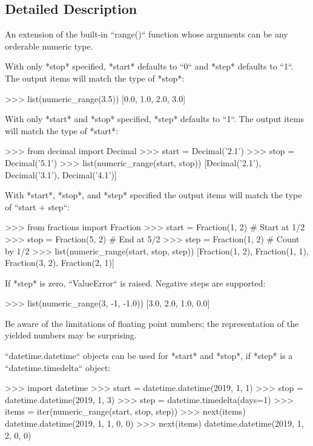 \subsection{Detailed Description}
\begin{DoxyVerb}An extension of the built-in ``range()`` function whose arguments can
be any orderable numeric type.

With only *stop* specified, *start* defaults to ``0`` and *step*
defaults to ``1``. The output items will match the type of *stop*:

    >>> list(numeric_range(3.5))
    [0.0, 1.0, 2.0, 3.0]

With only *start* and *stop* specified, *step* defaults to ``1``. The
output items will match the type of *start*:

    >>> from decimal import Decimal
    >>> start = Decimal('2.1')
    >>> stop = Decimal('5.1')
    >>> list(numeric_range(start, stop))
    [Decimal('2.1'), Decimal('3.1'), Decimal('4.1')]

With *start*, *stop*, and *step*  specified the output items will match
the type of ``start + step``:

    >>> from fractions import Fraction
    >>> start = Fraction(1, 2)  # Start at 1/2
    >>> stop = Fraction(5, 2)  # End at 5/2
    >>> step = Fraction(1, 2)  # Count by 1/2
    >>> list(numeric_range(start, stop, step))
    [Fraction(1, 2), Fraction(1, 1), Fraction(3, 2), Fraction(2, 1)]

If *step* is zero, ``ValueError`` is raised. Negative steps are supported:

    >>> list(numeric_range(3, -1, -1.0))
    [3.0, 2.0, 1.0, 0.0]

Be aware of the limitations of floating point numbers; the representation
of the yielded numbers may be surprising.

``datetime.datetime`` objects can be used for *start* and *stop*, if *step*
is a ``datetime.timedelta`` object:

    >>> import datetime
    >>> start = datetime.datetime(2019, 1, 1)
    >>> stop = datetime.datetime(2019, 1, 3)
    >>> step = datetime.timedelta(days=1)
    >>> items = iter(numeric_range(start, stop, step))
    >>> next(items)
    datetime.datetime(2019, 1, 1, 0, 0)
    >>> next(items)
    datetime.datetime(2019, 1, 2, 0, 0)\end{DoxyVerb}
 

